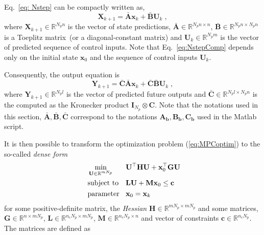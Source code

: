 % 
Eq.~\ref{eq: Nstep} can be compactly written as,
% 
\begin{equation}
    \label{eq:NstepComp}
    \mathbf{X}_{k+1} = \mathbf{\bar{A}x}_k + \mathbf{\bar{B}}\mathbf{U}_k \;,
\end{equation}
% 
where $\mathbf{X}_{k+1} \in \mathbb{R}^{N_pn}$ is the vector of state predictions, $\mathbf{\bar{A}} \in \mathbb{R}^{N_pn\times n}$, $\mathbf{\bar{B}} \in \mathbb{R}^{N_pn\times N_pn}$ is a Toeplitz matrix~(or a diagonal-constant matrix) and $\mathbf{U}_k \in \mathbb{R}^{N_pm}$ is the vector of predicted sequence of control inputs. Note that Eq.~\ref{eq:NstepComp} depends only on the initial state $\mathbf{x}_0$ and the sequence of control inputs $\mathbf{U}_k$.\par
Consequently, the output equation is
% 
\begin{equation}
\label{eq:Nstepout}
    \mathbf{Y}_{k+1} = \mathbf{\bar{C}}\mathbf{\bar{A}x}_k + \mathbf{\bar{C}}\mathbf{\bar{B}U}_k \;, 
\end{equation}
% 
where $\mathbf{Y}_{k+1} \in \mathbb{R}^{N_pl}$ is the vector of predicted future outputs and $\mathbf{\bar{C}} \in \mathbb{R}^{N_pl\times N_pn}$ is the computed as the Kronecker product $\mathbf{I}_{N_p} \otimes \mathbf{C}$. Note that the notations used in this section, $\mathbf{\bar{A},\bar{B},\bar{C}}$ correspond to the notations $\mathbf{A_b, B_b, C_b}$ used in the Matlab script.
\par
It is then possible to transform the optimization problem (\ref{eq:MPCoptim}) to the so-called \textit{dense form}
\begin{equation}
\label{eq:MPCdense}
\begin{alignedat}{2}
        &\min_{\mathbf{U} \in \mathbb{R}^{mN_p}} \quad && \mathbf{U}^\top\mathbf{H}\mathbf{U} +  \mathbf{x}_0^\top\mathbf{G}\mathbf{U} \\
        & \textup{subject to}\quad && \mathbf{L}\mathbf{U} + \mathbf{M}\mathbf{x}_0 \leq \mathbf{c} \\
        ~ & \textup{parameter} && \mathbf{x}_0 = \mathbf{x}_k
\end{alignedat}    
\end{equation}
for some positive-definite matrix, the \textit{Hessian} $\mathbf{H} \in \mathbb{R}^{mN_p \times mN_p}$ and some matrices, $\mathbf{G} \in \mathbb{R}^{n \times mN_p}$, $\mathbf{L} \in \mathbb{R}^{n_cN_p \times mN_p}$, $\mathbf{M} \in \mathbb{R}^{n_cN_p \times n}$ and vector of constraints $\mathbf{c} \in \mathbb{R}^{n_cN_p}$. The matrices are defined as
